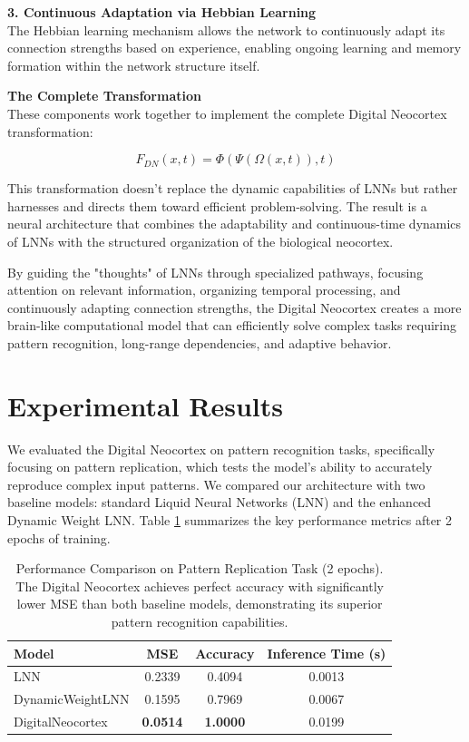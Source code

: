 \documentclass{article}
\begin{document}
\textbf{3. Continuous Adaptation via Hebbian Learning}\\
The Hebbian learning mechanism allows the network to continuously adapt its connection strengths based on experience, enabling ongoing learning and memory formation within the network structure itself.

\textbf{The Complete Transformation}\\
These components work together to implement the complete Digital Neocortex transformation:

\begin{equation}
F_{DN}(x, t) = \Phi(\Psi(\Omega(x, t)), t)
\end{equation}

This transformation doesn't replace the dynamic capabilities of LNNs but rather harnesses and directs them toward efficient problem-solving. The result is a neural architecture that combines the adaptability and continuous-time dynamics of LNNs with the structured organization of the biological neocortex.

By guiding the "thoughts" of LNNs through specialized pathways, focusing attention on relevant information, organizing temporal processing, and continuously adapting connection strengths, the Digital Neocortex creates a more brain-like computational model that can efficiently solve complex tasks requiring pattern recognition, long-range dependencies, and adaptive behavior.



\section{Experimental Results}
\label{sec:experiments}

We evaluated the Digital Neocortex on pattern recognition tasks, specifically focusing on pattern replication, which tests the model's ability to accurately reproduce complex input patterns. We compared our architecture with two baseline models: standard Liquid Neural Networks (LNN) and the enhanced Dynamic Weight LNN. Table \ref{tab:performance} summarizes the key performance metrics after 2 epochs of training.

\begin{table}[h]
  \centering
  \begin{tabular}{|l|c|c|c|}
  \hline
  \textbf{Model} & \textbf{MSE} & \textbf{Accuracy} & \textbf{Inference Time (s)} \\ \hline
  LNN & 0.2339 & 0.4094 & 0.0013 \\ \hline
  DynamicWeightLNN & 0.1595 & 0.7969 & 0.0067 \\ \hline
  DigitalNeocortex & \textbf{0.0514} & \textbf{1.0000} & 0.0199 \\ \hline
  \end{tabular}
  \caption{Performance Comparison on Pattern Replication Task (2 epochs). The Digital Neocortex achieves perfect accuracy with significantly lower MSE than both baseline models, demonstrating its superior pattern recognition capabilities.}
  \label{tab:performance}
\end{table}
\end{document}
